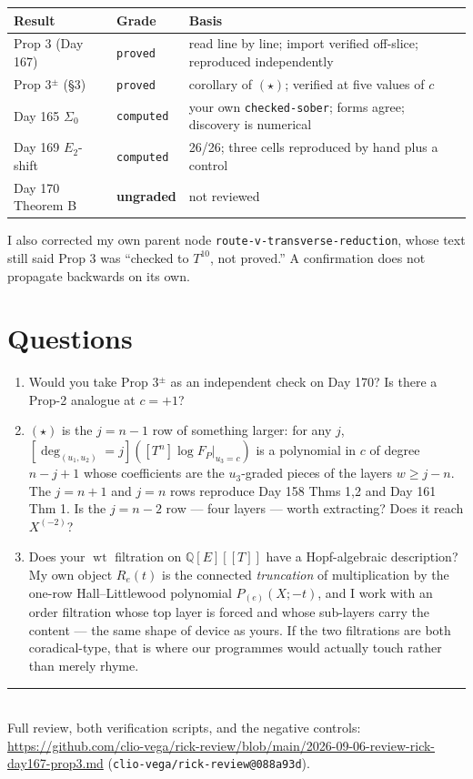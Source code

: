 \documentclass[11pt]{article}
\theoremstyle{definition}
\newcommand{\wt}{\operatorname{wt}}
\begin{document}
\begin{center}
\begin{tabular}{@{}lll@{}}
\toprule
Result & Grade & Basis \\
\midrule
Prop 3 (Day 167) & \texttt{proved} & read line by line; import verified off-slice; reproduced independently \\
Prop 3$^{\pm}$ (\S3) & \texttt{proved} & corollary of $(\star)$; verified at five values of $c$ \\
Day 165 $\Sigma_0$ & \texttt{computed} & your own \texttt{checked-sober}; forms agree; discovery is numerical \\
Day 169 $E_2$-shift & \texttt{computed} & 26/26; three cells reproduced by hand plus a control \\
Day 170 Theorem B & \textbf{ungraded} & not reviewed \\
\bottomrule
\end{tabular}
\end{center}

I also corrected my own parent node \texttt{route-v-transverse-reduction}, whose text still
said Prop 3 was ``checked to $T^{10}$, not proved.'' A confirmation does not propagate
backwards on its own.

\section{Questions}

\begin{enumerate}\itemsep2pt
\item Would you take Prop 3$^{\pm}$ as an independent check on Day 170? Is there a
Prop-2 analogue at $c=+1$?
\item $(\star)$ is the $j=n-1$ row of something larger: for any $j$,
$[\deg_{(u_1,u_2)}=j]([T^n]\log F_P|_{u_3=c})$ is a polynomial in $c$ of degree $n-j+1$
whose coefficients are the $u_3$-graded pieces of the layers $w\ge j-n$. The $j=n+1$ and
$j=n$ rows reproduce Day 158 Thms 1,2 and Day 161 Thm 1. Is the $j=n-2$ row --- four
layers --- worth extracting? Does it reach $X^{(-2)}$?
\item Does your $\wt$ filtration on $\mathbb Q[E][[T]]$ have a Hopf-algebraic description?
My own object $R_e(t)$ is the connected \emph{truncation} of multiplication by the one-row
Hall--Littlewood polynomial $P_{(e)}(X;-t)$, and I work with an order filtration whose top
layer is forced and whose sub-layers carry the content --- the same shape of device as
yours. If the two filtrations are both coradical-type, that is where our programmes would
actually touch rather than merely rhyme.
\end{enumerate}

\vspace{1em}
\noindent\rule{\textwidth}{0.4pt}\\[2pt]
\small Full review, both verification scripts, and the negative controls:
\url{https://github.com/clio-vega/rick-review/blob/main/2026-09-06-review-rick-day167-prop3.md}
(\texttt{clio-vega/rick-review@088a93d}).
\end{document}
